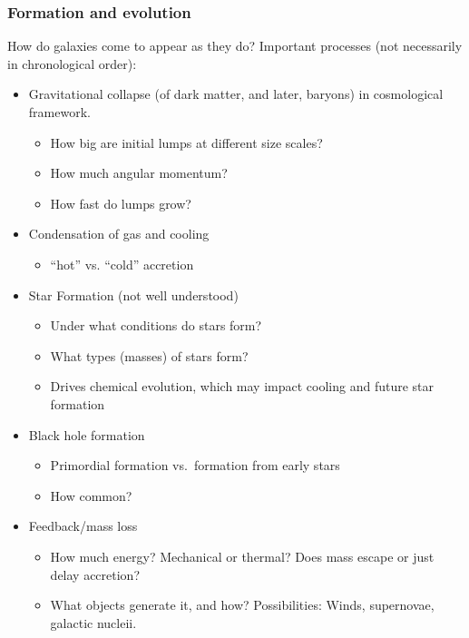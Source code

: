 \documentclass{article}
\begin{document}
\subsubsection{Formation and evolution}
How do galaxies come to appear as they do?
Important processes (not necessarily in chronological order):
\begin{itemize}
    \item Gravitational collapse (of dark matter, and later, baryons)
        in cosmological framework.
        \begin{itemize}
            \item How big are initial lumps at different size scales?
            \item How much angular momentum?
            \item How fast do lumps grow?
        \end{itemize}
    \item Condensation of gas and cooling
        \begin{itemize}
            \item ``hot'' vs. ``cold'' accretion
        \end{itemize}
    \item Star Formation (not well understood)
        \begin{itemize}
            \item Under what conditions do stars form?
            \item What types (masses) of stars form?
            \item Drives chemical evolution, which may impact
                cooling and future star formation
        \end{itemize}
    \item Black hole formation
        \begin{itemize}
            \item Primordial formation vs.\ formation from early stars
            \item How common?
        \end{itemize}
    \item Feedback/mass loss
        \begin{itemize}
            \item How much energy? Mechanical or thermal?
                Does mass escape or just delay accretion?
            \item What objects generate it, and how? Possibilities:
                Winds, supernovae, galactic nucleii.
        \end{itemize}

\end{itemize}
\end{document}

